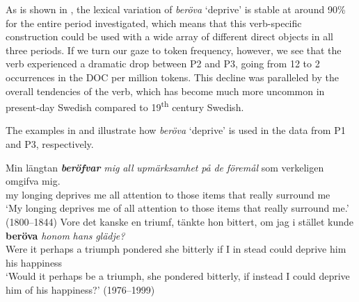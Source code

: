 \documentclass[output=paper]{langscibook}
\begin{document}
\label{sec:valdeson:5.3.3.1}



As is shown in , the lexical variation of \textit{beröva} ‘deprive’ is stable at around 90\% for the entire period investigated, which means that this verb-specific construction could be used with a wide array of different direct objects in all three periods. If we turn our gaze to token frequency, however, we see that the verb experienced a dramatic drop between P2 and P3, going from 12 to 2 occurrences in the DOC per million tokens. This decline was paralleled by the overall tendencies of the verb, which has become much more uncommon in present-day Swedish compared to 19\textsuperscript{th} century Swedish.


\begin{table}
\caption{Frequency measures of the verb{}-specific DOC with \textit{beröva} ‘deprive’}
\label{tab:valdeson:14}
\end{table}

The examples in  and  illustrate how \textit{beröva} ‘deprive’ is used in the data from P1 and P3, respectively.


\ea \label{ex:valdeson:20}
\gll Min längtan \textbf{\textit{beröfvar}} \textit{mig}   \textit{all}     \textit{upmärksamhet} \textit{på}   \textit{de}   \textit{föremål} som   verkeligen  omgifva     mig.\\
  my   longing deprives   me   all   attention       to     those   items that   really       surround   me\\
\glt ‘My longing deprives me of all attention to those items that really surround me.’ (1800–1844)
\ex \label{ex:valdeson:21}
\gll Vore  det  kanske  en  triumf,    tänkte    hon    bittert, om  jag  i   stället   kunde \textbf{beröva} \textit{honom}    \textit{hans}  \textit{glädje?}\\
  Were   it perhaps  a  triumph  pondered  she     bitterly if    I        in   stead    could   deprive  him        his    happiness\\
\glt ‘Would it perhaps be a triumph, she pondered bitterly, if instead I could deprive him of his happiness?’ (1976–1999)
\z
\end{document}
